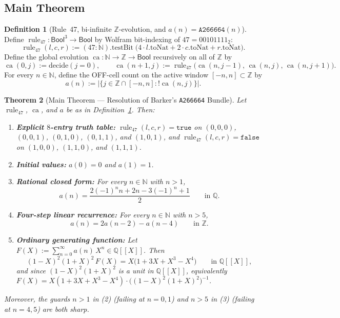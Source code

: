 \documentclass[11pt]{article}
\newcommand{\llbracket}{[\![}
\newcommand{\rrbracket}{]\!]}
\newtheorem{theorem}{Theorem}[section]
\theoremstyle{definition}
\newtheorem{definition}[theorem]{Definition}
\newcommand{\N}{\mathbb{N}}
\newcommand{\Z}{\mathbb{Z}}
\newcommand{\Q}{\mathbb{Q}}
\newcommand{\seq}[1]{\texttt{#1}}
\newcommand{\ruleFS}{\operatorname{rule}_{47}}
\newcommand{\ca}{\operatorname{ca}}
\begin{document}
\subsection{Main Theorem}

\begin{definition}[Rule~47, bi-infinite $\Z$-evolution, and $a(n) = \seq{A266664}(n)$]
\label{def:c055}
Define $\ruleFS : \mathsf{Bool}^3 \to \mathsf{Bool}$ by Wolfram bit-indexing of $47 = 00101111_2$:
\[
\ruleFS(l, c, r) := (47 : \N).\mathrm{testBit}\;\bigl(4 \cdot l.\mathrm{toNat} + 2 \cdot c.\mathrm{toNat} + r.\mathrm{toNat}\bigr).
\]
Define the global evolution $\ca : \N \to \Z \to \mathsf{Bool}$ recursively on all of $\Z$ by
\[
\ca(0, j) := \mathrm{decide}(j = 0), \qquad
\ca(n + 1, j) := \ruleFS\bigl(\ca(n, j - 1),\, \ca(n, j),\, \ca(n, j + 1)\bigr).
\]
For every $n \in \N$, define the OFF-cell count on the active window $[-n, n] \subset \Z$ by
\[
a(n) := \bigl|\{j \in \Z \cap [-n, n] : !\ca(n, j)\}\bigr|.
\]
\end{definition}

\begin{theorem}[Main Theorem --- Resolution of Barker's \seq{A266664} Bundle]
\label{thm:main}
Let $\ruleFS$, $\ca$, and $a$ be as in Definition~\ref{def:c055}. Then:
\begin{enumerate}
\item[\textup{(0)}] \textbf{Explicit $8$-entry truth table:} $\ruleFS(l, c, r) = \mathtt{true}$ on $(0,0,0)$, $(0,0,1)$, $(0,1,0)$, $(0,1,1)$, and $(1,0,1)$, and $\ruleFS(l, c, r) = \mathtt{false}$ on $(1,0,0)$, $(1,1,0)$, and $(1,1,1)$.
\item[\textup{(1)}] \textbf{Initial values:} $a(0) = 0$ and $a(1) = 1$.
\item[\textup{(2)}] \textbf{Rational closed form:} For every $n \in \N$ with $n > 1$,
\[
a(n) = \frac{2(-1)^n n + 2n - 3(-1)^n + 1}{2} \qquad \text{in }\Q.
\]
\item[\textup{(3)}] \textbf{Four-step linear recurrence:} For every $n \in \N$ with $n > 5$,
\[
a(n) = 2a(n - 2) - a(n - 4) \qquad \text{in }\Z.
\]
\item[\textup{(4)}] \textbf{Ordinary generating function:} Let $F(X) := \sum_{n=0}^{\infty} a(n)\,X^n \in \Q\llbracket X \rrbracket$. Then
\[
(1 - X)^2 (1 + X)^2 \, F(X) = X\bigl(1 + 3X + X^3 - X^4\bigr) \qquad \text{in }\Q\llbracket X \rrbracket,
\]
and since $(1 - X)^2(1 + X)^2$ is a unit in $\Q\llbracket X \rrbracket$, equivalently $F(X) = X(1 + 3X + X^3 - X^4)\cdot \bigl((1 - X)^2(1 + X)^2\bigr)^{-1}$.
\end{enumerate}
Moreover, the guards $n > 1$ in \textup{(2)} (failing at $n = 0, 1$) and $n > 5$ in \textup{(3)} (failing at $n = 4, 5$) are both sharp.
\end{theorem}
\end{document}

